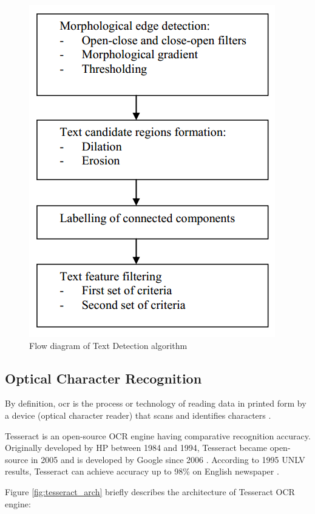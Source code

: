	\begin{figure}[H]
		\centering
		\includegraphics{Chapters/Fig/flow_diagram_morph.png}
		\caption{Flow diagram of Text Detection algorithm}
		\label{fig:flow_diagram_morph}
	\end{figure}

\subsection{Optical Character Recognition}
By definition, \gls{ocr} is the process or technology of reading data in printed form by a device (optical character reader) that scans and identifies characters \cite{ocr_def}.

Tesseract is an open-source OCR engine having comparative recognition accuracy. Originally developed by HP between 1984 and 1994, Tesseract became open-source in 2005 and is developed by Google since 2006 \cite{ocr_overview}. According to 1995 UNLV results, Tesseract can achieve accuracy up to 98\% on English newspaper \cite{Rice_thefourth}.

Figure \ref{fig:tesseract_arch} briefly describes the architecture of Tesseract OCR engine:


